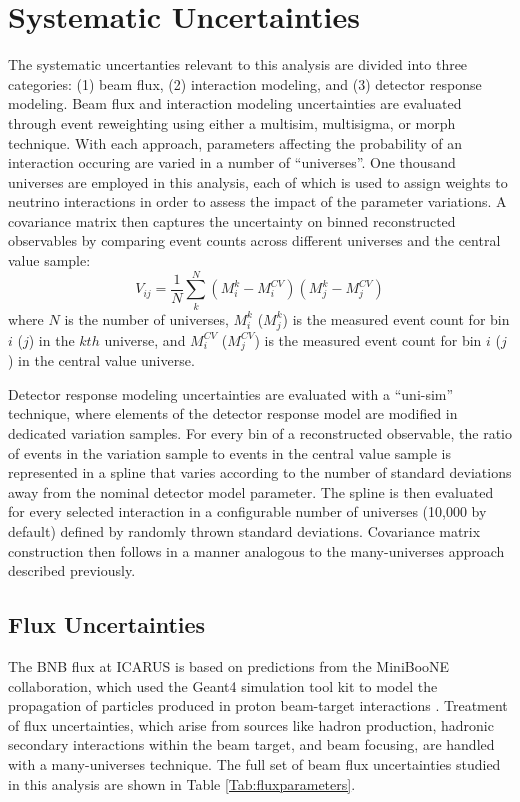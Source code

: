 \documentclass[../main.tex]{subfiles}
\begin{document}
\section{Systematic Uncertainties}
\label{sec:systs}
The systematic uncertanties relevant to this analysis are divided into three categories: (1) beam flux, (2) interaction modeling, and (3) detector response modeling.  Beam flux and interaction modeling uncertainties are evaluated through event reweighting using either a multisim, multisigma, or morph technique.  With each approach, parameters affecting the probability of an interaction occuring are varied in a number of ``universes''.  One thousand universes are employed in this analysis, each of which is used to assign weights to neutrino interactions in order to assess the impact of the parameter variations.  A covariance matrix then captures the uncertainty on binned reconstructed observables by comparing event counts across different universes and the central value sample:
\begin{equation}
    V_{ij} = \frac{1}{N} \sum_{k}^{N} (M_{i}^{k} - M_{i}^{CV}) (M_{j}^{k} - M_{j}^{CV})
\end{equation}
where $N$ is the number of universes, $M_{i}^{k}$ ($M_{j}^{k}$) is the measured event count for bin $i$ ($j$) in the $kth$ universe, and $M_{i}^{CV}$ ($M_{j}^{CV}$) is the measured event count for bin $i$ ($j$) in the central value universe.

Detector response modeling uncertainties are evaluated with a ``uni-sim'' technique, where elements of the detector response model are modified in dedicated variation samples.  For every bin of a reconstructed observable, the ratio of events in the variation sample to events in the central value sample is represented in a spline that varies according to the number of standard deviations away from the nominal detector model parameter.  The spline is then evaluated for every selected interaction in a configurable number of universes (10,000 by default) defined by randomly thrown standard deviations.  Covariance matrix construction then follows in a manner analogous to the many-universes approach described previously.

\subsection{Flux Uncertainties}
The BNB flux at ICARUS is based on predictions from the MiniBooNE collaboration, which used the Geant4 simulation tool kit to model the propagation of particles produced in proton beam-target interactions \cite{bnbflux}.  Treatment of flux uncertainties, which arise from sources like hadron production, hadronic secondary interactions within the beam target, and beam focusing, are handled with a many-universes technique.  The full set of beam flux uncertainties studied in this analysis are shown in Table \ref{Tab:fluxparameters}.
\end{document}

